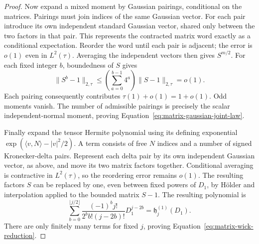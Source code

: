 \begin{proof}
Now expand a mixed moment by Gaussian pairings, conditional on the
matrices.  Pairings must join indices of the same Gaussian vector.  For
each pair introduce its own independent standard Gaussian vector, shared
only between the two factors in that pair.  This represents the
contracted matrix word exactly as a conditional expectation.  Reorder the
word until each pair is adjacent; the error is $o(1)$ even in
$L^2(\tau)$.  Averaging the independent vectors then gives $S^{m/2}$.
For each fixed integer $b$, boundedness of $S$ gives
\[
 \|S^b-1\|_{2,\tau}
 \le\left(\sum_{a=0}^{b-1}4^a\right)\|S-1\|_{2,\tau}=o(1).
\]
Each pairing consequently contributes $\tau(1)+o(1)=1+o(1)$.
Odd moments vanish.  The number of admissible pairings is precisely the
scalar independent-normal moment, proving
Equation~\eqref{eq:matrix-gaussian-joint-law}.

Finally expand the tensor Hermite polynomial using its defining
exponential
$\exp(\langle v,N\rangle-|v|^2/2)$.
A term consists of free $N$ indices and a number of signed Kronecker-delta
pairs.  Represent each delta pair by its own independent Gaussian vector,
as above, and move its two matrix factors together.  Conditional averaging
is contractive in $L^2(\tau)$, so the reordering error remains $o(1)$.
The resulting factors $S$ can be replaced by one, even between fixed
powers of $D_1$, by H\"older and interpolation applied to the bounded
matrix $S-1$.  The resulting polynomial is
\[
 \sum_{b=0}^{\lfloor j/2\rfloor}
 \frac{(-1)^b j!}{2^bb!(j-2b)!}D_1^{j-2b}
 =\mathfrak h_j^{(1)}(D_1).
\]
There are only finitely many terms for fixed $j$, proving
Equation~\eqref{eq:matrix-wick-reduction}.
\end{proof}

